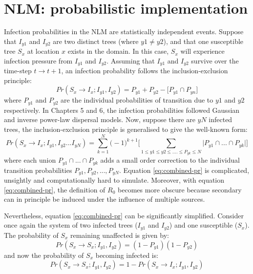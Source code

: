 \newpage

\section{NLM: probabilistic implementation}
\label{A:combiniing-probabilities}

Infection probabilities in the NLM are statistically independent events.
Suppose that $I_{y1}$ and $I_{y2}$ are two distinct trees (where $y1 \neq y2$), and that one susceptible tree $S_x$ at location $x$ exists in the domain.
In this case, $S_x$ will experience infection pressure from $I_{y1}$ and $I_{y2}$.
Assuming that $I_{y1}$ and $I_{y2}$ survive over the time-step $t \rightarrow t + 1$, an infection probability follows the inclusion-exclusion principle:
\begin{equation}
    Pr(S_x \rightarrow I_{x}; I_{y1}, I_{y2}) = P_{y1} + P_{y2} - \big[ P_{y1} \cap P_{yn} \big] 
\end{equation}
where $P_{y1}$ and $P_{y2}$ are the individual probabilities of transition due to $y1$ and $y2$ respectively.
In Chapters 5 and 6, the infection probabilities followed Gaussian and inverse power-law dispersal models.
Now, suppose there are $yN$ infected trees, the inclusion-exclusion principle is generalised to give the well-known form:
\begin{equation}
\label{eq:combined-pr}
     Pr(S_x \rightarrow I_{x}; I_{y1}, I_{y2}...I_{yN}) = \sum_{k=1}^{N} \big(  -1 \big)^{k+1} \Big[ \sum _{1\leq y1 \leq y2 \leq....\leq P_{yk} \leq N} \big| P_{y1}\cap ...\cap P_{yk}  \big|   \Big]
\end{equation}
where each union $P_{y1} \cap ... \cap P_{yk}$ adds a small order correction to the individual transition probabilities $P_{y1}, P_{y2},..., P_{yN}$.
Equation \ref{eq:combined-pr} is complicated, unsightly and computationally hard to simulate.
Moreover, with equation \ref{eq:combined-pr}, the definition of $R_0$ becomes more obscure because secondary can in principle be induced under the influence of multiple sources.

Nevertheless, equation \ref{eq:combined-pr} can be significantly simplified. 
Consider once again the system of two infected trees ($I_{y1}$ and $I_{y2}$) and one susceptible ($S_x$).
The probability of $S_x$ remaining unaffected is given by:
\begin{equation}
    Pr(S_x \rightarrow S_{x}; I_{y1}, I_{y2}) = (1 - P_{y1})(1 -P_{y2})
\end{equation}
and now the probability of $S_x$ becoming infected is:
\begin{equation}
\label{eq:pr-simp}
    Pr(S_x \rightarrow S_{x}; I_{y1}, I_{y2}) = 1 - Pr(S_x \rightarrow I_{x}; I_{y1}, I_{y2})
\end{equation}

